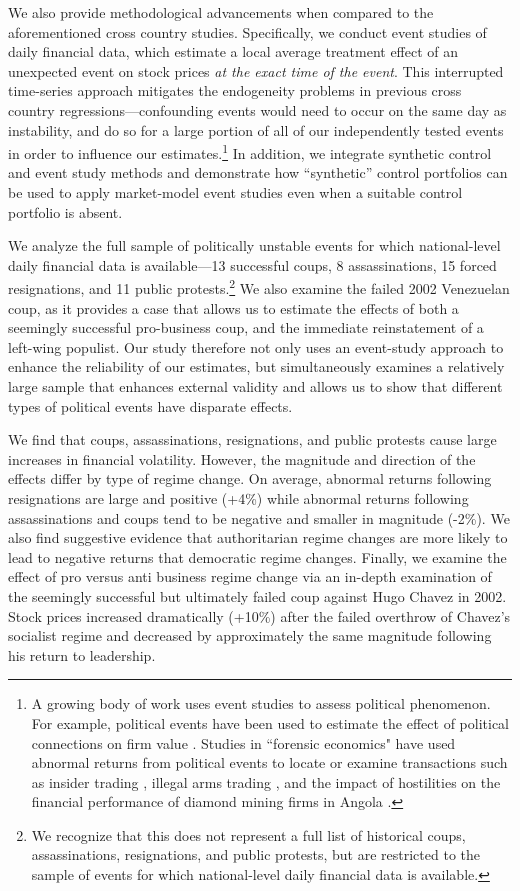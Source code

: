 \documentclass[12pt,final,fleqn]{article}
\theoremstyle{plain}
\begin{document}
We also provide methodological advancements when compared to the aforementioned cross country studies. Specifically, we conduct event studies of daily financial data, which estimate a local average treatment effect of an unexpected event on stock prices \textit{at the exact time of the event}. This interrupted time-series approach mitigates the endogeneity problems in previous cross country regressions---confounding events would need to occur on the same day as instability, and do so for a large portion of all of our independently tested events in order to influence our estimates.\footnote{A growing body of work uses event studies to assess political phenomenon.  For example, political events have been used to estimate the effect of political connections on firm value \citep[e.g.][]{fisman2001estimating,faccio2006politically,goldman2009politically}. Studies in ``forensic economics" have used abnormal returns from political events to locate or examine transactions such as insider trading \citep{dube2011coups}, illegal arms trading \citep{dellavigna2010detecting}, and the impact of hostilities on the financial performance of diamond mining firms in Angola \citep{guidolin2007diamonds}.} In addition, we integrate synthetic control and event study methods and demonstrate how ``synthetic'' control portfolios can be used to apply market-model event studies even when a suitable control portfolio is absent.

We analyze the full sample of politically unstable events for which national-level daily financial data is available---13 successful coups, 8 assassinations, 15 forced resignations, and 11 public protests.\footnote{We recognize that this does not represent a full list of historical coups, assassinations, resignations, and public protests, but are restricted to the sample of events for which national-level daily financial data is available.} We also examine the failed 2002 Venezuelan coup, as it provides a case that allows us to estimate the effects of both a seemingly successful pro-business coup, and the immediate reinstatement of a left-wing populist. Our study therefore not only uses an event-study approach to enhance the reliability of our estimates, but simultaneously examines a relatively large sample that enhances external validity and allows us to show that different types of political events have disparate effects. 

We find that coups, assassinations, resignations, and public protests cause large increases in financial volatility. However, the magnitude and direction of the effects differ by type of regime change. On average, abnormal returns following resignations are large and positive (+4\%) while abnormal returns following assassinations and coups tend to be negative and smaller in magnitude (-2\%). We also find suggestive evidence that authoritarian regime changes are more likely to lead to negative returns that democratic regime changes. Finally, we examine the effect of pro versus anti business regime change via an in-depth examination of the seemingly successful but ultimately failed coup against Hugo Chavez in 2002. Stock prices increased dramatically (+10\%) after the failed overthrow of Chavez's socialist regime and decreased by approximately the same magnitude following his return to leadership.
\end{document}
